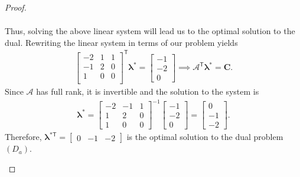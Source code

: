 \documentclass[12pt]{article}
\theoremstyle{definition}
\newcommand{\vc}[1]{\boldsymbol{#1}}
\newcommand{\tran}{\mathsf{T}}
\begin{document}
\begin{proof}
\begin{enumerate}
\begin{align*}
      \end{align*}
      Thus, solving the above linear system will lead us to the optimal solution to the dual.
      Rewriting the linear system in terms of our problem yields
      \begin{align*}
        \begin{bmatrix}-2 & 1 & 1 \\ -1 & 2 & 0 \\ 1 & 0 & 0 \\\end{bmatrix}^\tran\vc{\lambda}^{*} = \begin{bmatrix}-1 \\ -2 \\ 0\end{bmatrix}
        \implies \mathscr{A}^\tran \vc{\lambda}^{*} = \vc{C}.
      \end{align*}
      Since $\mathscr{A}$ has full rank, it is invertible and the solution to
      the system is
      \begin{align*}
        \vc{\lambda}^{*} = \begin{bmatrix}-2 & -1 & 1 \\ 1 & 2 & 0 \\ 1 & 0 & 0\end{bmatrix}^{-1}
        \begin{bmatrix}-1 \\ -2 \\ 0\end{bmatrix}
        = \begin{bmatrix}0 \\ -1 \\ -2\end{bmatrix}.
      \end{align*}
      Therefore, $\vc{\lambda}^{*\tran} = \begin{bmatrix}0 & -1 & -2\end{bmatrix}$ is the optimal solution to
      the dual problem $(D_a)$.

  \end{enumerate}
\end{proof}
\newpage
\end{document}
